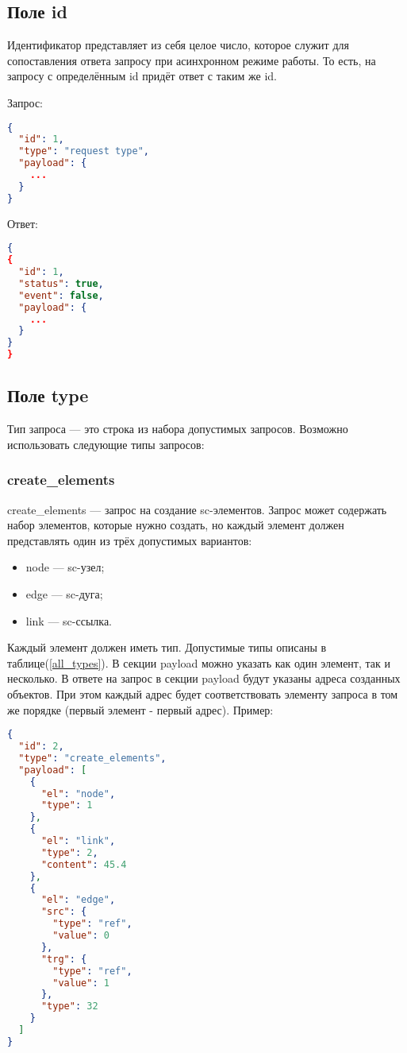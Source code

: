 \subsection{Поле id}
Идентификатор представляет из себя целое число, которое служит для сопоставления ответа запросу при асинхронном режиме работы. То есть, на запросу с определённым id придёт ответ с таким же id.

Запрос:
\begin{lstlisting}[language=json,firstnumber=1]
{
  "id": 1,
  "type": "request type",
  "payload": {
    ...
  }
}
\end{lstlisting}
Ответ:
\begin{lstlisting}[language=json,firstnumber=1]
{
{
  "id": 1,
  "status": true,
  "event": false, 
  "payload": {
    ...
  }
}
}
\end{lstlisting}


\subsection{Поле type}
Тип запроса --- это строка из набора допустимых запросов. Возможно использовать следующие типы запросов: 
\subsubsection{create\_elements}
create\_elements --- запрос на создание sc-элементов.  Запрос может содержать набор элементов, которые нужно создать, но каждый элемент должен представлять один из трёх допустимых вариантов: 
\begin{itemize}
\item node --- sc-узел;
\item edge --- sc-дуга;
\item link --- sc-ссылка.
\end{itemize}
Каждый элемент должен иметь тип. Допустимые типы описаны в таблице(\ref{all_types}).
В секции payload можно указать как один элемент, так и несколько. В ответе на запрос в секции payload будут указаны адреса созданных объектов. При этом каждый адрес будет соответствовать элементу запроса в том же порядке (первый элемент - первый адрес). 
Пример:
\begin{lstlisting}[language=json,firstnumber=1]
{
  "id": 2,
  "type": "create_elements",
  "payload": [
    {
      "el": "node",
      "type": 1
    },
    {
      "el": "link",
      "type": 2,
      "content": 45.4
    },
    {
      "el": "edge",
      "src": {
        "type": "ref",
        "value": 0
      },
      "trg": {
        "type": "ref",
        "value": 1
      },
      "type": 32
    }
  ]
}
\end{lstlisting}

